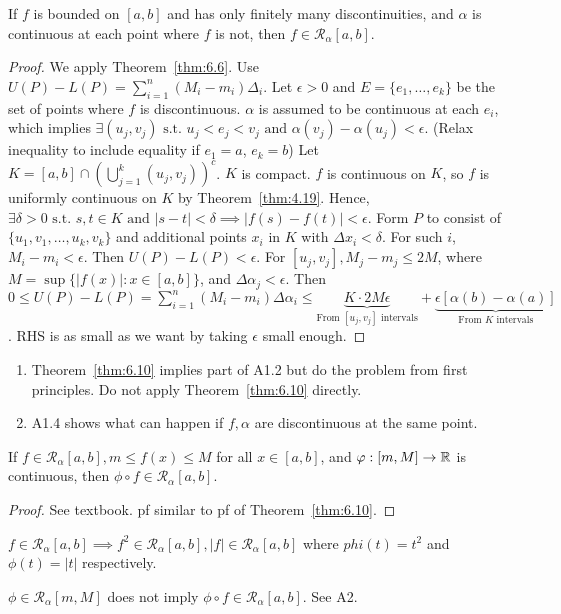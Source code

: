 \begin{thm}[10]
	If $f$ is bounded on $[a,b]$ and has only finitely many discontinuities, and $\alpha$ is continuous at each point where $f$ is not, then $f \in \mathscr{R}_{\alpha}[a,b]$.
	\begin{proof}
		We apply Theorem~\ref{thm:6.6}.
		Use $U(P)-L(P)=\sum_{i=1}^{n}{( M_{i}-m_{i} )\Delta_{i}}$.
		Let $\epsilon>0$ and $E=\{e_1,\ldots ,e_{k}\} $ be the set of points where $f$ is discontinuous.
		$\alpha$ is assumed to be continuous at each $e_i$, which implies $\exists{(u_j,v_j)} \text{ s.t. } u_j<e_j<v_j \text{ and } \alpha(v_j)-\alpha(u_j)<\epsilon$. (Relax inequality to include equality if $e_1=a$, $e_k=b$)
		Let $K=[a,b] \cap \left(\bigcup_{j=1}^{k}(u_j,v_j)\right)^{c}$. $K$ is compact.
		$f$ is continuous on $K$, so $f$ is uniformly continuous on $K$ by Theorem~\ref{thm:4.19}.
		Hence, $\exists{\delta>0} \text{ s.t. } s , t \in K \text{ and }  |s-t|<\delta \implies |f(s)-f(t)|<\epsilon$.
		Form $P$ to consist of $\{u_1,v_1,\ldots ,u_{k},v_{k}\}$ and additional points $x_i$ in $K$ with $\Delta x_i < \delta$. For such $i$, $M_i-m_i<\epsilon$.
		Then $U(P)-L(P)<\epsilon$.
		For $[u_{j},v_{j}], M_j-m_j \le 2M$, where $M=\sup\{|f(x)|: x \in [a,b]\}$, and $\Delta \alpha_{j}<\epsilon$.
		Then $0\le U(P)-L(P)=\sum_{i=1}^{n}{(M_{i}-m_{i}) \Delta \alpha_i}\le \underbrace{K \cdot 2M \epsilon}_{\text{From $[u_j,v_j]$ intervals}}+\underbrace{\epsilon[\alpha(b)-\alpha(a)]}_{\text{From $K$ intervals}}$.
		RHS is as small as we want by taking $\epsilon$ small enough.
	\end{proof}
	\begin{remark}
		\begin{enumerate}
			\item Theorem~\ref{thm:6.10} implies part of A1.2 but do the problem from first principles. Do not apply Theorem~\ref{thm:6.10} directly.
			\item A1.4 shows what can happen if $f,\alpha$ are discontinuous at the same point.
		\end{enumerate}
	\end{remark}
\end{thm}

\begin{thm}[11]
	If $f \in \mathscr{R}_{\alpha}[a,b], m \le f(x)\le M$ for all $x \in [a,b]$, and $\varphi:[m,M]\to \mathbb{R}$ is continuous, then $\phi \circ f \in \mathscr{R}_{\alpha}[a,b]$.
	\begin{proof}
		See textbook. pf similar to pf of Theorem~\ref{thm:6.10}.
	\end{proof}
	\begin{example}
		$f \in \mathscr{R}_{\alpha}[a,b]\implies f^2 \in \mathscr{R}_{\alpha}[a,b], |f| \in \mathscr{R}_{\alpha}[a,b]$ where $phi(t)=t^2$ and $\phi(t)=|t|$ respectively.
	\end{example}
	\begin{note}
		$\phi \in \mathscr{R}_{\alpha}[m,M]$ does not imply $\phi \circ f \in \mathscr{R}_{\alpha}[a,b]$. See A2.
	\end{note}
\end{thm}
